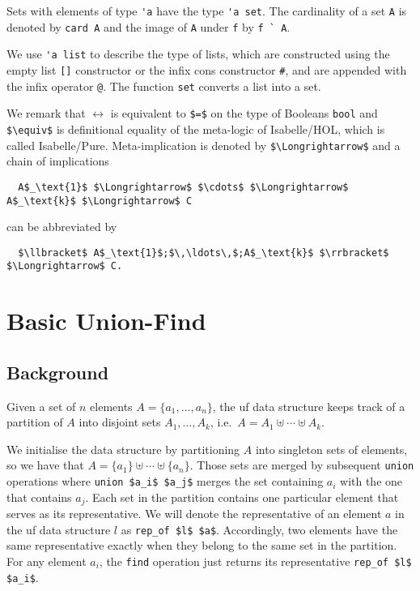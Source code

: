 \documentclass[
  sigplan,
  10pt,
  anonymous,
  review,
  ]{acmart}
\begin{document}
Sets with elements of type \lstinline!'a! have the type \lstinline!'a set!.
The cardinality of a set \lstinline!A! is denoted by \lstinline!card A! and the image of \lstinline!A! under \lstinline!f! by \lstinline!f ` A!.

We use \lstinline!'a list! to describe the type of lists, which are constructed using the empty list \lstinline![]! constructor or the infix cons constructor \lstinline!#!, and are appended with the infix operator \lstinline!@!.
The function \lstinline!set! converts a list into a set.

We remark that $\longleftrightarrow$ is equivalent to \lstinline!$=$! on the type of Booleans \lstinline!bool! and \lstinline!$\equiv$! is definitional equality of the meta-logic of Isabelle/HOL, which is called Isabelle/Pure.
Meta-implication is denoted by \lstinline!$\Longrightarrow$! and a chain of implications
\begin{lstlisting}
  A$_\text{1}$ $\Longrightarrow$ $\cdots$ $\Longrightarrow$ A$_\text{k}$ $\Longrightarrow$ C
\end{lstlisting}
can be abbreviated by 
\begin{lstlisting}
  $\llbracket$ A$_\text{1}$;$\,\ldots\,$;A$_\text{k}$ $\rrbracket$ $\Longrightarrow$ C.
\end{lstlisting}

\section{Basic Union-Find}
\subsection{Background\label{sec:uf_background}}
Given a set of $n$ elements $A = \{a_1, \ldots, a_n\}$, the \acrfull{uf} data structure keeps track of a partition of $A$ into disjoint sets $A_1, \ldots, A_k$, i.e.\ $A = A_1 \uplus \cdots \uplus A_k$.

We initialise the data structure by partitioning $A$ into singleton sets of elements,
so we have that $A = \{a_1\} \uplus \cdots \uplus \{a_n\}$.
Those sets are merged by subsequent \lstinline!union! operations where \lstinline!union $a_i$ $a_j$! merges the set containing $a_i$ with the one that contains $a_j$.
Each set in the partition contains one particular element that serves as its representative.
We will denote the representative of an element $a$ in the \acrshort{uf} data structure $l$ as \lstinline!rep_of $l$ $a$!.
Accordingly, two elements have the same representative exactly when they belong to the same set in the partition.
For any element $a_i$, the \lstinline!find! operation just returns its representative \lstinline!rep_of $l$ $a_i$!.
\end{document}
